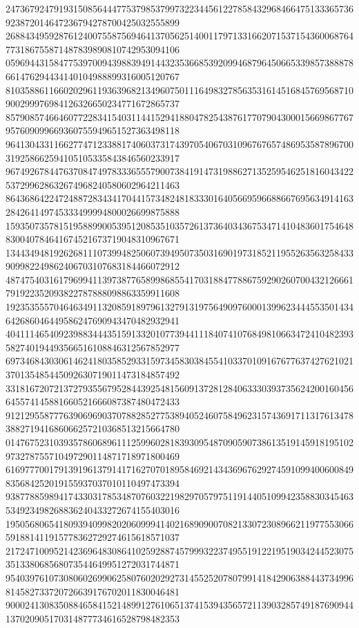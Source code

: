 \begin{DoxyCode}
      247367924791931508564447753798537997322344561227858432968466475133365736923872014647236794278700425032555899
      268843495928761240075587569464137056251400117971331662071537154360068764773186755871487839890810742953094106
      059694431584775397009439883949144323536685392099468796450665339857388878661476294434140104988899316005120767
      810358861166020296119363968213496075011164983278563531614516845769568710900299976984126326650234771672865737
      857908574664607722834154031144152941880478254387617707904300015669867767957609099669360755949651527363498118
      964130433116627747123388174060373174397054067031096767657486953587896700319258662594105105335843846560233917
      967492678447637084749783336555790073841914731988627135259546251816043422537299628632674968240580602964211463
      864368642247248872834341704415734824818333016405669596688667695634914163284264149745333499994800026699875888
      159350735781519588990053951208535103572613736403436753471410483601754648830040784641674521673719048310967671
      134434948192626811107399482506073949507350316901973185211955263563258433909982249862406703107683184466072912
      487475403161796994113973877658998685541703188477886759290260700432126661791922352093822787888098863359911608
      192353555704646349113208591897961327913197564909760001399623444553501434642686046449586247690943470482932941
      404111465409239883444351591332010773944111840741076849810663472410482393582740194493566516108846312567852977
      697346843030614624180358529331597345830384554103370109167677637427621021370135485445092630719011473184857492
      331816720721372793556795284439254815609137281284063330393735624200160456645574145881660521666087387480472433
      912129558777639069690370788285277538940524607584962315743691711317613478388271941686066257210368513215664780
      014767523103935786068961112599602818393095487090590738613519145918195102973278755710497290114871718971800469
      616977700179139196137914171627070189584692143436967629274591099400600849835684252019155937037010110497473394
      938778859894174330317853487076032219829705797511914405109942358830345463534923498268836240433272674155403016
      195056806541809394099820206099941402168909007082133072308966211977553066591881411915778362729274615618571037
      217247100952142369648308641025928874579993223749551912219519034244523075351338068568073544649951272031744871
      954039761073080602699062580760202927314552520780799141842906388443734996814582733720726639176702011830046481
      900024130835088465841521489912761065137415394356572113903285749187690944137020905170314877734616528798482353

\end{DoxyCode}
